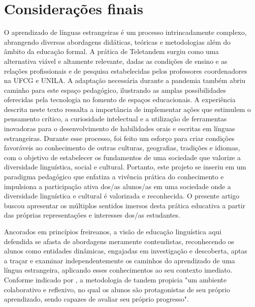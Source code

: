 \documentclass[portuguese]{textolivre}
\begin{document}
\section{Considerações finais}

O aprendizado de línguas estrangeiras é um processo intrincadamente complexo, abrangendo diversas abordagens didáticas, teóricas e metodologias além do âmbito da educação formal. A prática de Teletandem surgiu como uma alternativa viável e altamente relevante, dadas as condições de ensino e as relações profissionais e de pesquisa estabelecidas pelos professores coordenadores na UFCG e UNILA. A adaptação necessária durante a pandemia também abriu caminho para este espaço pedagógico, ilustrando as amplas possibilidades oferecidas pela tecnologia no fomento de espaços educacionais. A experiência descrita neste texto ressalta a importância de implementar ações que estimulem o pensamento crítico, a curiosidade intelectual e a utilização de ferramentas inovadoras para o desenvolvimento de habilidades orais e escritas em línguas estrangeiras. Durante esse processo, foi feito um esforço para criar condições favoráveis ao conhecimento de outras culturas, geografias, tradições e idiomas, com o objetivo de estabelecer os fundamentos de uma sociedade que valorize a diversidade linguística, social e cultural. Portanto, este projeto se inseriu em um paradigma pedagógico que enfatiza a vivência prática do conhecimento e impulsiona a participação ativa dos/as alunos/as em uma sociedade onde a diversidade linguística e cultural é valorizada e reconhecida. O presente artigo buscou apresentar os múltiplos sentidos imersos desta prática educativa a partir das próprias representações e interesses dos/as estudantes.

Ancorados em princípios freireanos, a visão de educação linguística aqui defendida se afasta de abordagens meramente conteudistas, reconhecendo os alunos como entidades dinâmicas, engajadas em investigação e descoberta, aptas a traçar e examinar independentemente os caminhos do aprendizado de uma língua estrangeira, aplicando esses conhecimentos ao seu contexto imediato. Conforme indicado por \textcite[p.464]{tirloni_tandem_2015}, a metodologia de tandem propicia "um ambiente colaborativo e reflexivo, no qual os alunos são protagonistas de seu próprio aprendizado, sendo capazes de avaliar seu próprio progresso". 
\end{document}
